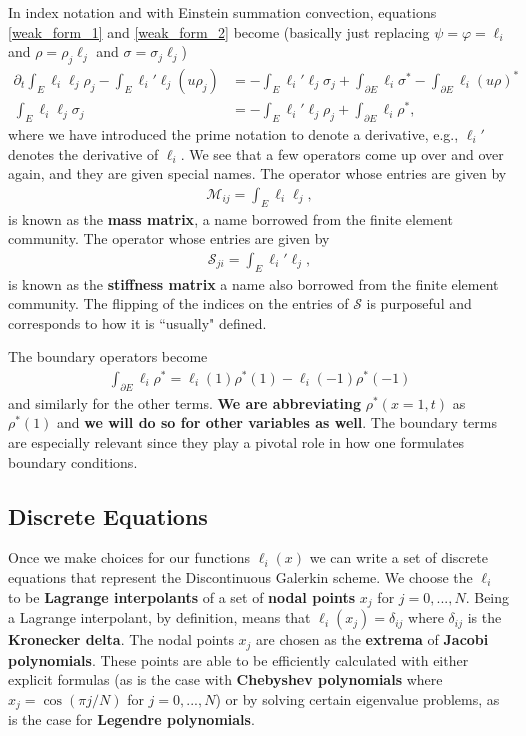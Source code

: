 \documentclass{report}
\numberwithin{equation}{section}
\begin{document}
In index notation and with Einstein summation convection, equations \ref{weak_form_1} and \ref{weak_form_2} become (basically just replacing $\psi = \varphi = \ell_i$ and $\rho = \rho_j \ell_j$ and $\sigma = \sigma_j \ell_j$)
\begin{align}
    \label{discrete_weak_form_1}
    \partial_t \int_E \ell_i \ell_j \rho_j - \int_E  \ell_i' \ell_j (u \rho_j) &= 
    - \int_E \ell_i' \ell_j \sigma_j
    + \int_{\partial E} \ell_i \sigma^* - \int_{\partial E}  \ell_i  (u \rho)^* 
    \\
    \label{discrete_weak_form_2}
    \int_E \ell_i \ell_j \sigma_j &= - \int_{E} \ell_i' \ell_j \rho_j + \int_{\partial E } \ell_i \rho^*,
\end{align}
where we have introduced the prime notation to denote a derivative, e.g., $\ell_i'$ denotes the derivative of $\ell_i$. We see that a few operators come up over and over again, and they are given special names. The operator whose entries are given by
\begin{align}
    \mathcal{M}_{ij} = \int_{E} \ell_i \ell_j,
\end{align}
is known as the \textbf{mass matrix}, a name borrowed from the finite element community. The operator whose entries are given by
\begin{align}
    \mathcal{S}_{ji} = \int_{E} \ell_i' \ell_j,
\end{align}
is known as the \textbf{stiffness matrix} a name also borrowed from the finite element community. The flipping of the indices on the entries of $\mathcal{S}$ is purposeful and corresponds to how it is ``usually" defined. 

The boundary operators become
\begin{align}
    \int_{\partial E } \ell_i \rho^* = \ell_i(1) \rho^*(1) - \ell_i(-1) \rho^*(-1)
\end{align}
and similarly for the other terms. \textbf{We are abbreviating} $\rho^*(x = 1, t)$ as $\rho^*(1)$ and \textbf{we will do so for other variables as well}. The boundary terms are especially relevant since they play a pivotal role in how one formulates boundary conditions. 

\subsection{Discrete Equations}

Once we make choices for our functions $\ell_i(x)$ we can write a set of discrete equations that represent the Discontinuous Galerkin scheme. We choose the $\ell_i$ to be \textbf{Lagrange interpolants} of a set of \textbf{nodal points} $x_j$ for $j = 0, ..., N$.  Being a Lagrange interpolant, by definition, means that $\ell_i(x_j) = \delta_{ij}$ where $\delta_{ij}$ is the \textbf{Kronecker delta}. The nodal points $x_j$ are chosen as the \textbf{extrema} of \textbf{Jacobi polynomials}. These points are able to be efficiently calculated with either explicit formulas (as is the case with \textbf{Chebyshev polynomials} where $x_j = \cos(\pi j / N)$ for $j = 0, ..., N$) or by solving certain eigenvalue problems, as is the case for \textbf{Legendre polynomials}.
\end{document}
